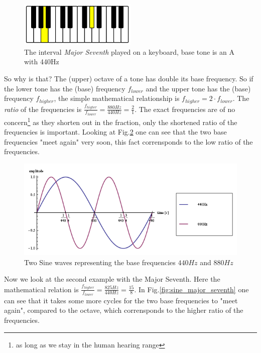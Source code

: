 \documentclass[12pt,a4paper,titlepage,oneside]{report}
\begin{document}
\begin{figure}[!ht]
\includegraphics[width=0.5\textwidth]{images/keyboard_major_seventh.png}
\centering
\caption{The interval \textit{Major Seventh} played on a keyboard, base tone is an A with 440Hz}
\label{fig:keyboard_major_seventh}
\end{figure}

So why is that? The (upper) octave of a tone has double its base frequency. So if the lower tone has the (base) frequency $f_{lower}$ and the upper tone has the (base) frequency $f_{higher}$, the simple mathematical relationship is $f_{higher} = 2 \cdot f_{lower}$. The \textit{ratio} of the frequencies is $\frac{f_{higher}}{f_{lower}} = \frac{880Hz}{440Hz} = \frac{2}{1}$. The exact frequencies are of no concern\footnote{as long as we stay in the human hearing range} as they shorten out in the fraction, only the shortened ratio of the frequencies is important. Looking at Fig.\ref{fig:sine_octave} one can see that the two base frequencies "meet again" very soon, this fact corrensponds to the low ratio of the frequencies.

\begin{figure}[!ht]
\includegraphics[width=\textwidth]{images/sine_octave.png}
\centering
\caption{Two Sine waves representing the base frequencies $440Hz$ and $880Hz$}
\label{fig:sine_octave}
\end{figure}

Now we look at the second example with the Major Seventh. Here the mathematical relation is $\frac{f_{higher}}{f_{lower}} = \frac{825Hz}{440Hz} = \frac{15}{8}$. In Fig.\ref{fig:sine_major_seventh} one can see that it takes some more cycles for the two base frequencies to "meet again", compared to the octave, which corrensponds to the higher ratio of the frequencies.
\end{document}
